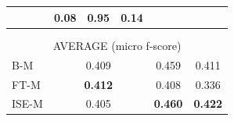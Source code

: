 \documentclass[11pt]{article}
\begin{document}
\begin{table}[!h]
\begin{tabular}{|l||l|l|l||l|l|l||l|l|l|}
\hline
    \tiny{\cite{strapparava2008learning} } &
    \footnotesize{0.08} & 
    \footnotesize{\textbf{0.95}} & 
    \footnotesize{0.14} &
    &
    &
    &
    &
    &
    \\

\hline
    \tiny{\cite{kim2010evaluation} } &
    & 
    & 
    &
    &
    &
    &
    &
    &
    \\
    
\hline
    \tiny{\cite{danisman2008feeler} } &
    \footnotesize{} & 
    \footnotesize{} & 
    \footnotesize{} &
    \footnotesize{} & 
    \footnotesize{} & 
    \footnotesize{} &
    \footnotesize{} & 
    \footnotesize{} & 
    \footnotesize{} \\

\hline
\hline


    \multicolumn{10}{|c|}{{AVERAGE (micro f-score)}} \\                               
    
\hline
  \tiny{B-M} & 
  \multicolumn{3}{c|}{  \footnotesize{0.409} } &
  \multicolumn{3}{c|}{  \footnotesize{0.459} } &
  \multicolumn{3}{c|}{  \footnotesize{0.411} } 
\\ 

\hline
    \tiny{FT-M} & 
      \multicolumn{3}{|c|}{  \footnotesize{\textbf{0.412}} } &
  \multicolumn{3}{|c|}{  \footnotesize{0.408} } &
  \multicolumn{3}{|c|}{  \footnotesize{0.336} } 
\\ 


\hline
    \tiny{ISE-M} & 
      \multicolumn{3}{|c|}{  \footnotesize{0.405} } &
  \multicolumn{3}{|c|}{  \footnotesize{\textbf{0.460}} } &
  \multicolumn{3}{c|}{  \footnotesize{\textbf{0.422}} } 
\\ 

\hline
%
%    

\end{tabular}
\end{table}
\end{document}
